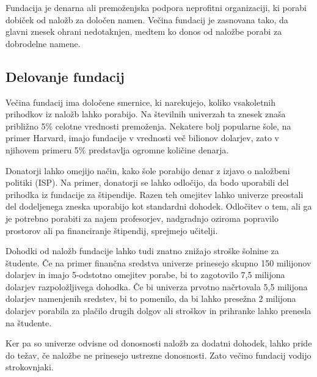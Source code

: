 \documentclass[12pt, a4paper]{article}
\begin{document}
Fundacija je denarna ali premoženjska podpora neprofitni organizaciji, ki porabi dobiček od naložb za določen namen. Večina fundacij je zasnovana tako, da glavni znesek ohrani nedotaknjen, medtem ko donos od naložbe porabi za dobrodelne namene. 

\subsection{Delovanje fundacij}

Večina fundacij ima določene smernice, ki narekujejo, koliko vsakoletnih prihodkov iz naložb lahko porabijo. Na številnih univerzah ta znesek znaša približno 5\% celotne vrednosti premoženja. Nekatere bolj popularne šole, na primer Harvard, imajo fundacije v vrednosti več bilionov dolarjev, zato v njihovem primeru 5\% predstavlja ogromne količine denarja. \cite{Investopedia}

Donatorji lahko omejijo način, kako šole porabijo denar z izjavo o naložbeni politiki (ISP). Na primer, donatorji se lahko odločijo, da bodo uporabili del prihodka iz fundacije za štipendije. Razen teh omejitev lahko univerze preostali del dodeljenega zneska uporabijo kot standardni dohodek. Odločitev o tem, ali ga je potrebno porabiti za najem profesorjev, nadgradnjo oziroma popravilo prostorov ali pa financiranje štipendij, sprejmejo učitelji. 

Dohodki od naložb fundacije lahko tudi znatno znižajo stroške šolnine za študente. Če na primer finančna sredstva univerze prinesejo skupno 150 milijonov dolarjev in imajo 5-odstotno omejitev porabe, bi to zagotovilo 7,5 milijona dolarjev razpoložljivega dohodka. Če bi univerza prvotno načrtovala 5,5 milijona dolarjev namenjenih sredstev, bi to pomenilo, da bi lahko presežna 2 milijona dolarjev porabila za plačilo drugih dolgov ali stroškov in prihranke lahko prenesla na študente. \cite{Investopedia}

Ker pa so univerze odvisne od donosnosti naložb za dodatni dohodek, lahko pride do težav, če naložbe ne prinesejo ustrezne donosnosti. Zato večino fundacij vodijo strokovnjaki.
\end{document}

